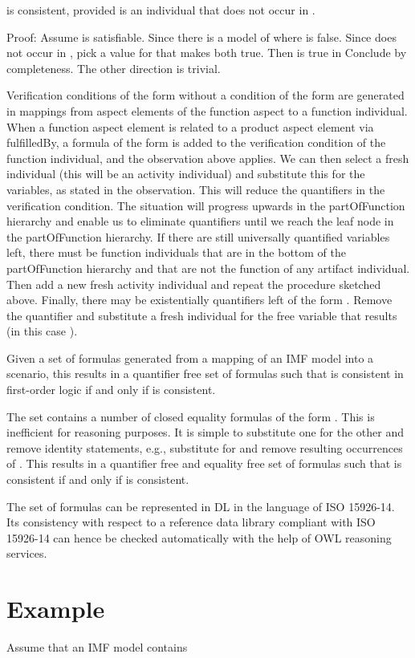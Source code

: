 is consistent, provided  is an individual that does not occur in .

Proof: Assume  is satisfiable. Since  there is a model of  where   is false. Since  does not occur in , pick a value
for that makes  both true. Then  is true in  Conclude by completeness. The other direction is trivial.

Verification conditions of the form  without a condition of the form are generated in mappings from aspect elements of
the function aspect to a function individual. When a function aspect element is related to a product aspect element
via fulfilledBy, a formula of the form  is added to the verification condition of the function individual, and the
observation above applies. We can then select a fresh individual (this will be an activity individual) and substitute
this for the variables, as stated in the observation. This will reduce the quantifiers in the verification condition.
The situation will progress upwards in the partOfFunction hierarchy and enable us to eliminate quantifiers until we
reach the leaf node in the partOfFunction hierarchy. If there are still universally quantified variables left, there
must be function individuals that are in the bottom of the partOfFunction hierarchy and that are not the function of
any artifact individual. Then add a new fresh activity individual and repeat the procedure sketched above. Finally,
there may be existentially quantifiers left of the form . Remove the quantifier and substitute a fresh individual for
the free variable that results (in this case ).

Given a set  of formulas generated from a mapping of an IMF model into a scenario, this results in a quantifier free
set of formulas  such that  is consistent in first-order logic if and only if is consistent.

The set  contains a number of closed equality formulas of the form . This is inefficient for reasoning purposes. It is
simple to substitute one for the other and remove identity statements, e.g., substitute  for  and remove resulting
occurrences of . This results in a quantifier free and equality free set of formulas  such that  is consistent if and
only if is consistent.

The set of formulas can be represented in DL in the language of ISO 15926-14. Its consistency with respect to a
reference data library compliant with ISO 15926-14 can hence be checked automatically with the help of OWL reasoning
services.

\section{Example}
Assume that an IMF model contains

